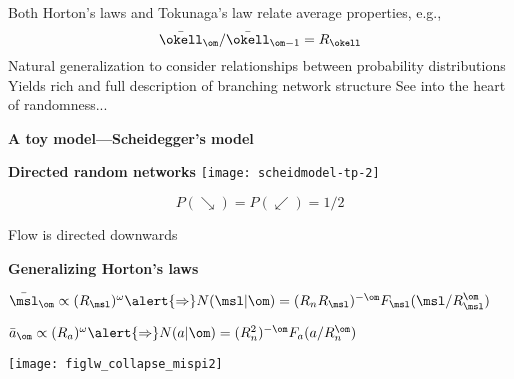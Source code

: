 \begin{frame}[label=]
\begin{frame}[label=]
\begin{frame}[label=]
\begin{frame}[label=]
\begin{frame}[label=]
\begin{frame}[label=]
\begin{frame}[label=]
\begin{frame}[label=]
\begin{frame}[label=]
\begin{frame}[label=]
\begin{frame}[label=]
\begin{frame}[label=]
\begin{frame}[label=]
\begin{frame}[label=]
\begin{frame}[label=]
\begin{frame}[label=]
\begin{frame}[label=]
\begin{frame}[label=]
\begin{frame}[label=]
\begin{frame}[label=]
\begin{frame}[label=]
\begin{frame}[label=]
\begin{frame}[label=]
\begin{frame}[label=]
\begin{frame}[label=]
\begin{frame}[label=]
\begin{frame}[label=]
\begin{frame}[label=]
\begin{frame}[label=]
\begin{frame}[label=]
\begin{frame}[label=]
\begin{frame}[label=]
\begin{frame}[label=]
\begin{frame}[label=]
\begin{frame}[label=]
\begin{frame}[label=]
\begin{frame}[label=]
\begin{frame}[label=]
\begin{frame}[label=]
\begin{frame}[label=]
\begin{frame}[label=]
       Both Horton's laws and Tokunaga's law
        relate average properties, e.g.,
        $$ \bar{\okell}_\om / \bar{\okell}_{\om-1} = R_\okell$$
       Natural generalization to consider
        relationships between \alert{probability distributions}
       Yields rich and full description of 
        branching network structure
       See into the heart of randomness...
      
    


\begin{frame}[label=]
  \textbf{A toy model---Scheidegger's model}

  \textbf{Directed random networks\cite{scheidegger1967a,scheidegger1991a}}
    \texttt{[image: scheidmodel-tp-2]}
    
    
      $$P(\searrow) = P (\swarrow) = 1/2$$
    
      Flow is directed downwards
    
  




\begin{frame}[label=]
  \textbf{Generalizing Horton's laws}

  
  
    $\bar{\msl}_\om \propto (R_\msl)^\omega \alert{\Rightarrow}
    N(\msl|\om) = (R_nR_\msl)^{-\om} F_\msl(\msl / R_\msl^{\om}) $
  
    $\bar{a}_\om \propto (R_a)^\omega \alert{\Rightarrow}
    N(a|\om) = (R_n^2)^{-\om} F_a(a / R_n^{\om}) $
  
      
          
      
      \texttt{[image: figlw\_collapse\_mispi2]}
        
           
      

\end{frame}
\end{frame}
\end{frame}
\end{frame}
\end{frame}
\end{frame}
\end{frame}
\end{frame}
\end{frame}
\end{frame}
\end{frame}
\end{frame}
\end{frame}
\end{frame}
\end{frame}
\end{frame}
\end{frame}
\end{frame}
\end{frame}
\end{frame}
\end{frame}
\end{frame}
\end{frame}
\end{frame}
\end{frame}
\end{frame}
\end{frame}
\end{frame}
\end{frame}
\end{frame}
\end{frame}
\end{frame}
\end{frame}
\end{frame}
\end{frame}
\end{frame}
\end{frame}
\end{frame}
\end{frame}
\end{frame}
\end{frame}
\end{frame}
\end{frame}
